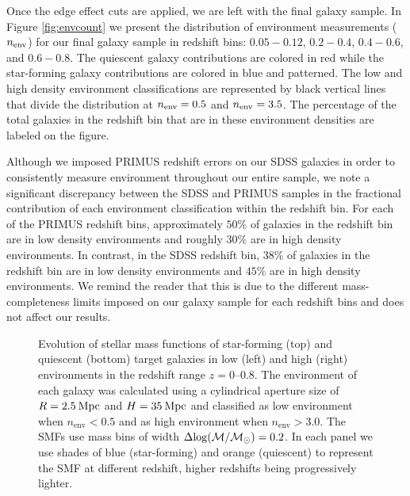 \documentclass{emulateapj}
\def \apradius{2.5}
\def \apheight{35}
\begin{document}
Once the edge effect cuts are applied, we are left with the final galaxy sample. In Figure \ref{fig:envcount} we present the distribution of environment measurements ($n_{\rm{env}}$) for our final galaxy sample in redshift bins: $0.05 - 0.12$, $0.2 - 0.4$, $0.4-0.6$, and $0.6-0.8$. The quiescent galaxy contributions are colored in red while the star-forming galaxy contributions are colored in blue and patterned. The low and high density environment classifications are represented by black vertical lines that divide the distribution at $n_{\rm{env}} = 0.5$ and $n_{\rm{env}} = 3.5$. The percentage of the total galaxies in the redshift bin that are in these environment densities are labeled on the figure. 

Although we imposed PRIMUS redshift errors on our SDSS galaxies in order to consistently measure environment throughout our entire sample, we note a significant discrepancy between the SDSS and PRIMUS samples in the fractional contribution of each environment classification within the redshift bin. For each of the PRIMUS redshift bins, approximately $50 \%$ of galaxies in the redshift bin are in low density environments and roughly $30 \%$ are in high density environments. In contrast, in the SDSS redshift bin, $38 \%$ of galaxies in the redshift bin are in low density environments and $45 \%$ are in high density environments. We remind the reader that this is due to the different mass-completeness limits imposed on our galaxy sample for each redshift bins and does not affect our results. 
\begin{figure*}
  \begin{center}
    \leavevmode
     \caption{Evolution of stellar mass functions of star-forming (top) and quiescent (bottom) target galaxies in 
low (left) and high (right) environments in the redshift range
$z=0$--$0.8$. The environment of each galaxy  
was calculated using a cylindrical aperture size of $R=\apradius \: \rm{Mpc}$ and $H=\apheight \: \rm{Mpc}$ and  
classified as low environment when $n_{\mathrm{env}} < 0.5$ and as high environment when $n_{\mathrm{env}} > 3.0$. The SMFs use mass bins of 
width $\Delta \rm{log}(\mathcal{M}/\mathcal{M}_{\odot})=0.2$. In each panel we use shades of blue 
(star-forming) and orange (quiescent) to represent the SMF at different redshift, higher redshifts being
progressively lighter.}      \label{fig:smf}
    \end{center}
\end{figure*}
\end{document}
